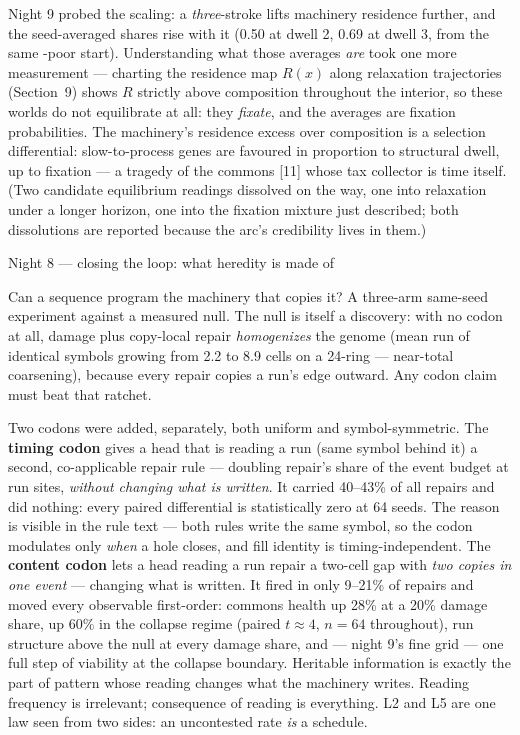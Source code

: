 Night 9 probed the scaling: a {\it three}-stroke  lifts
machinery residence further, and the seed-averaged  shares
rise with it (0.50 at dwell 2, 0.69 at dwell 3, from the same
-poor start). Understanding what those averages {\it are}
took one more measurement --- charting the residence map $R(x)$
along relaxation trajectories (Section~9) shows $R$ strictly
above composition throughout the interior, so these worlds do not
equilibrate at all: they {\it fixate}, and the averages are
fixation probabilities.  The machinery's residence
excess over composition is a selection differential:
slow-to-process genes are favoured in proportion to structural
dwell, up to fixation --- a tragedy of the commons [11] whose tax
collector is time itself. (Two candidate equilibrium readings
dissolved on the way, one into relaxation under a longer horizon,
one into the fixation mixture just described; both dissolutions
are reported because the arc's credibility lives in them.)

\secc Night 8 --- closing the loop: what heredity is made of

Can a sequence program the machinery that copies it? A three-arm
same-seed experiment against a measured null. The null is itself a
discovery: with no codon at all, damage plus copy-local repair
{\it homogenizes} the genome (mean run of identical symbols
growing from 2.2 to 8.9 cells on a 24-ring --- near-total
coarsening), because every repair copies a run's edge outward. Any
codon claim must beat that ratchet.

Two codons were added, separately, both uniform and
symbol-symmetric. The {\bf timing codon} gives a head that is
reading a run (same symbol behind it) a second, co-applicable
repair rule --- doubling repair's share of the event budget at run
sites, {\it without changing what is written}. It carried 40--43\%
of all repairs and did nothing: every paired differential is
statistically zero at 64 seeds. The reason is visible in the rule
text --- both rules write the same symbol, so the codon modulates
only {\it when} a hole closes, and fill identity is
timing-independent. The {\bf content codon} lets a head reading a
run repair a two-cell gap with {\it two copies in one event} ---
changing what is written. It fired in only 9--21\% of repairs and
moved every observable first-order: commons health up 28\% at a
20\% damage share, up 60\% in the collapse regime (paired
$t\approx4$, $n{=}64$ throughout), run structure above the null at
every damage share, and --- night 9's fine grid --- one full step
of viability at the collapse boundary.  Heritable
information is exactly the part of pattern whose reading changes
what the machinery writes. Reading frequency is irrelevant;
consequence of reading is everything. L2 and L5 are one law seen
from two sides: an uncontested rate {\it is} a schedule.

